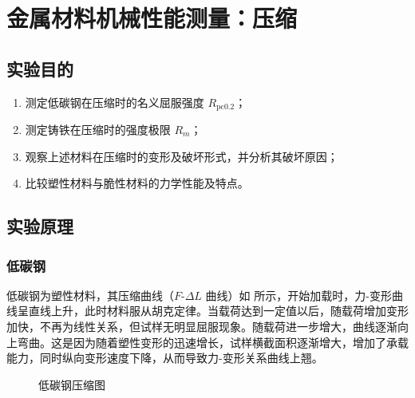 \chapter{金属材料机械性能测量：压缩}
\section{实验目的}
    \begin{enumerate}
        \item 测定低碳钢在压缩时的名义屈服强度 $R_\text{pc0.2}$；
        \item 测定铸铁在压缩时的强度极限 $R_m$；
        \item 观察上述材料在压缩时的变形及破坏形式，并分析其破坏原因；
        \item 比较塑性材料与脆性材料的力学性能及特点。
    \end{enumerate}
\section{实验原理}%
    \subsection{低碳钢}
        低碳钢为塑性材料，其压缩曲线（$F$-$\Delta L$ 曲线）如 所示，开始加载时，力-变形曲线呈直线上升，此时材料服从胡克定律。当载荷达到一定值以后，随载荷增加变形加快，不再为线性关系，但试样无明显屈服现象。随载荷进一步增大，曲线逐渐向上弯曲。这是因为随着塑性变形的迅速增长，试样横截面积逐渐增大，增加了承载能力，同时纵向变形速度下降，从而导致力-变形关系曲线上翘。
        \begin{figure}[!ht]
            \hspace{10mm}
            \caption{低碳钢压缩图}
        \end{figure}
